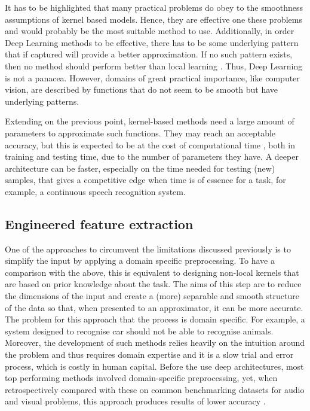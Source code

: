 \documentclass[a4paper]{article}
\begin{document}
		It has to be highlighted that many practical problems do obey to the smoothness assumptions of kernel based models. Hence, they are effective one these problems and would probably be the most suitable method to use. Additionally, in order Deep Learning methods to be effective, there has to be some underlying pattern that if captured will provide a better approximation. If no such pattern exists, then no method should perform better than local learning \cite{Bengio2009}. Thus, Deep Learning is not a panacea. However, domains of great practical importance, like computer vision, are described by functions that do not seem to be smooth but have underlying patterns.
		
		Extending on the previous point, kernel-based methods need a large amount of parameters to approximate such functions. They may reach an acceptable accuracy, but this is expected to be at the cost of computational time \cite{Bengio2007}, both in training and testing time, due to the number of parameters they have. A deeper architecture can be faster, especially on the time needed for testing (new) samples, that gives a competitive edge when time is of essence for a task, for example, a continuous speech recognition system.
		
	\subsection{Engineered feature extraction}
	\label{sub: eng. features}
		One of the approaches to circumvent the limitations discussed previously is to simplify the input by applying a domain specific preprocessing. To have a comparison with the above, this is equivalent to designing non-local kernels that are based on prior knowledge about the task. The aims of this step are to reduce the dimensions of the input and create a (more) separable and smooth structure of the data so that, when presented to an approximator, it can be more accurate. The problem for this approach that the process is domain specific\cite{Bengio2007}. For example, a system designed to recognise car should not  be able to recognise animals. Moreover, the development of such methods relies heavily on the intuition around the problem and thus requires domain expertise and it is a slow trial and error process, which is costly in human capital. Before the use deep architectures, most top performing methods involved domain-specific preprocessing, yet, when retrospectively compared with these on common benchmarking datasets for audio and visual problems, this approach produces results of lower accuracy \cite{Krizhevsky2012}. 
		
\end{document}
